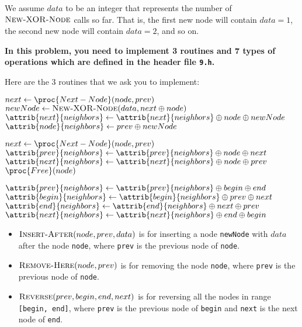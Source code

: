 We assume $data$ to be an integer that represents the number of $\textsc{New-XOR-Node}$ calls so far. That is, the first new node will contain $data = 1$, the second new node will contain $data = 2$, and so on.

\textbf{In this problem, you need to implement 3 routines and 7 types of operations which are defined in the header file \texttt{9.h}.}

Here are the 3 routines that we ask you to implement:

\begin{codebox}
\li $next \gets \proc{Next-Node}(node, prev)$
\li $newNode \gets \textsc{New-XOR-Node}(data, next \oplus node)$
\li $\attrib{next}{neighbors} \gets \attrib{next}{neighbors} \oplus node \oplus newNode$
\li $\attrib{node}{neighbors} \gets prev \oplus newNode$
\End
\end{codebox}

\begin{codebox}
\li $next \gets \proc{Next-Node}(node, prev)$
\li $\attrib{prev}{neighbors} \gets \attrib{prev}{neighbors} \oplus node \oplus next$
\li $\attrib{next}{neighbors} \gets \attrib{next}{neighbors} \oplus node \oplus prev$
\li $\proc{Free}(node)$
\End
\end{codebox}

\begin{codebox}
\li $\attrib{prev}{neighbors} \gets \attrib{prev}{neighbors} \oplus begin \oplus end$
\li $\attrib{begin}{neighbors} \gets \attrib{begin}{neighbors} \oplus prev \oplus next$
\li $\attrib{end}{neighbors} \gets \attrib{end}{neighbors} \oplus next \oplus prev$
\li $\attrib{next}{neighbors} \gets \attrib{next}{neighbors} \oplus end \oplus begin$
\End
\end{codebox}

\begin{itemize}
    \item $\textsc{Insert-After}(node, prev, data)$ is for inserting a node \texttt{newNode} with $data$ after the node \texttt{node}, where \texttt{prev} is the previous node of \texttt{node}.
    \item $\textsc{Remove-Here}(node, prev)$ is for removing the node \texttt{node}, where \texttt{prev} is the previous node of \texttt{node}.
    \item $\textsc{Reverse}(prev, begin, end, next)$ is for reversing all the nodes in range \texttt{[begin, end]}, where \texttt{prev} is the previous node of \texttt{begin} and \texttt{next} is the next node of \texttt{end}.
\end{itemize}

